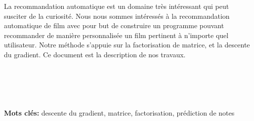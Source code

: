 \documentclass[a4paper,10pt]{article}
\begin{document}
La recommandation automatique est un domaine très intéressant qui peut susciter de la curiosité. Nous nous sommes intéressés à la recommandation
automatique de film avec pour but de construire un programme pouvant recommander de manière personnalisée un film pertinent à n'importe quel utilisateur. Notre méthode s'appuie 
sur la factorisation de matrice, et la descente du gradient. Ce document est la description de nos travaux. \\ \\ \\ \\ \\ \\

\textbf{{Mots clés:}} descente du gradient, matrice, factorisation, prédiction de notes %
\end{document}
